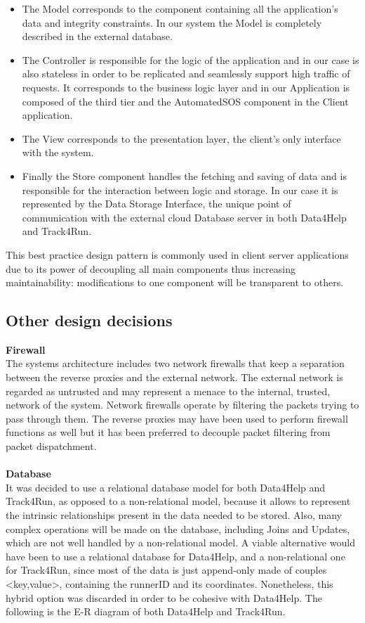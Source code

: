 \documentclass[titlepage]{article}
\begin{document}
\begin{itemize}
        \item {} The Model corresponds to the component containing all the application’s data and integrity constraints. In our system the Model is completely described in the external database.
		\item {} The Controller is responsible for the logic of the application and in our case is also stateless in order to be replicated and seamlessly support high traffic of requests. It corresponds to the business logic layer and in our Application is composed of the third tier and the AutomatedSOS component in the Client application. 
		\item {} The View corresponds to the presentation layer, the client’s only interface with the system. 
		\item {} Finally the Store component handles the fetching and saving of data and is responsible for the interaction between logic and storage. In our case it is represented by the Data Storage Interface, the unique point of communication with the external cloud Database server in both Data4Help and Track4Run.
    \end{itemize} 
This best practice design pattern is commonly used in client server applications due to its power of decoupling all main components thus increasing maintainability: modifications to one component will be transparent to others.
\pagebreak


\subsection{Other design decisions}

{\bf Firewall}\\
The systems architecture includes two network firewalls that keep a separation between the reverse proxies and the external network. The external network is regarded as untrusted and may represent a menace to the internal, trusted, network of the system.
Network firewalls operate by filtering the packets trying to pass through them.
The reverse proxies may have been used to perform firewall functions as well but it has been preferred to decouple packet filtering from packet dispatchment.\\ \\
{\bf Database}\\
It was decided to use a relational database model for both Data4Help and Track4Run, as opposed to a non-relational model, because it allows to represent the intrinsic relationships present in the data needed to be stored. Also, many complex operations will be made on the database, including Joins and Updates, which are not well handled by a non-relational model. 
A viable alternative would have been to use a relational database for Data4Help, and a non-relational one for Track4Run, since most of the data is just append-only made of couples <key,value>, containing the runnerID and its coordinates. Nonetheless, this hybrid option was discarded in order to be cohesive with Data4Help.
The following is the E-R diagram of both Data4Help and Track4Run.
\end{document}
